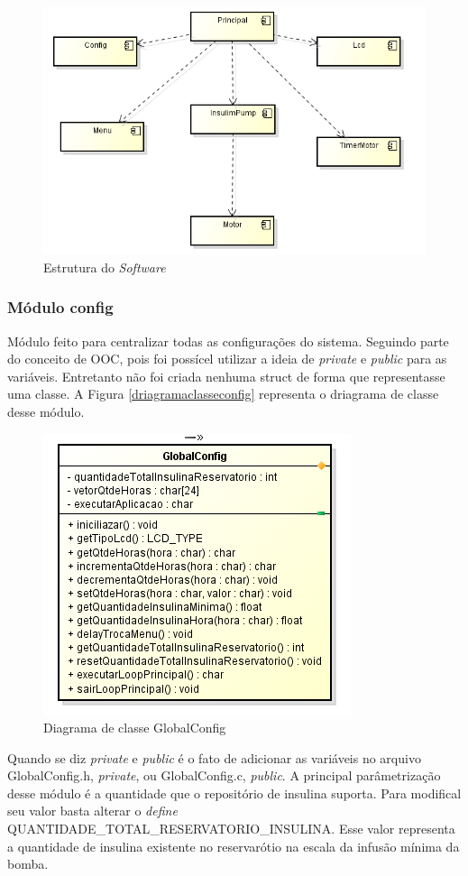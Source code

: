 \begin{figure}[htp]
	\centering
	\includegraphics[scale=0.7]{images/arquitetura.png}
	\caption{Estrutura do \emph{Software}}	
	\label{fig:arquiteturageral}
\end{figure}

\subsubsection{Módulo config}

Módulo feito para centralizar todas as configurações do sistema. Seguindo parte do conceito de OOC, pois foi possícel utilizar a ideia de \emph{private} e \emph{public} para as variáveis. Entretanto não foi criada nenhuma struct de forma que representasse uma classe. A Figura \ref{driagramaclasseconfig} representa o driagrama de classe desse módulo.


\begin{figure}[htp]
	\centering
	\includegraphics[scale=1]{images/classe_GlobalConfig.png}
	\caption{Diagrama de classe GlobalConfig}	
	\label{fig:driagramaclasseconfig}
\end{figure}

Quando se diz \emph{private} e \emph{public} é o fato de adicionar as variáveis no arquivo GlobalConfig.h, \emph{private}, ou GlobalConfig.c, \emph{public}. A principal parâmetrização desse módulo é a quantidade que o repositório de insulina suporta. Para modifical seu valor basta alterar o \emph{define} QUANTIDADE\_TOTAL\_RESERVATORIO\_INSULINA. Esse valor representa a quantidade de insulina existente no reservarótio na escala da infusão mínima da bomba.

